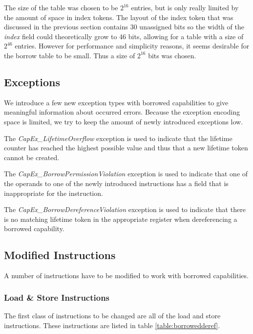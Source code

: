 The size of the table was chosen to be $2^{16}$ entries, but is only really limited by the amount of space in index tokens. The layout of the index token that was discussed in the previous section contains 30 unassigned bits so the width of the \textit{index} field could theoretically grow to 46 bits, allowing for a table with a size of $2^{46}$ entries. However for performance and simplicity reasons, it seems desirable for the borrow table to be small. Thus a size of $2^{16}$ bits was chosen.

\subsection{Exceptions}
We introduce a few new exception types with borrowed capabilities to give meaningful information about occurred errors. Because the exception encoding space is limited, we try to keep the amount of newly introduced exceptions low.

The \textit{CapEx\_LifetimeOverflow} exception is used to indicate that the lifetime counter has reached the highest possible value and thus that a new lifetime token cannot be created.

The \textit{CapEx\_BorrowPermissionViolation} exception is used to indicate that one of the operands to one of the newly introduced instructions has a field that is inappropriate for the instruction.

The \textit{CapEx\_BorrowDereferenceViolation} exception is used to indicate that there is no matching lifetime token in the appropriate register when dereferencing a borrowed capability.

\subsection{Modified Instructions}
\label{sec:borrowmodinsts}
A number of instructions have to be modified to work with borrowed capabilities.

\subsubsection{Load \& Store Instructions}
The first class of instructions to be changed are all of the load and store instructions. These instructions are listed in table \ref{table:borrowedderef}.

